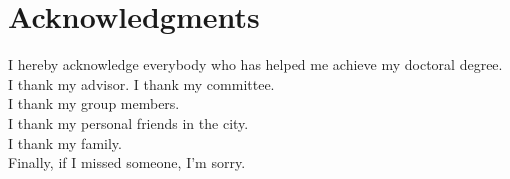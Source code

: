 


\bigskip

\begingroup
\let\clearpage\relax
\let\cleardoublepage\relax
\let\cleardoublepage\relax

\chapter*{Acknowledgments}
I hereby acknowledge everybody who has helped me achieve my doctoral degree.\\


I thank my advisor. I thank my committee.\\

I thank my group members. \\

I thank my personal friends in the city. \\

I thank my family. \\

Finally, if I missed someone, I'm sorry. \\
\bigskip

\begin{flushright}
\myName \\
\myLocation \\
\myMonth \myYear
\end{flushright}

\endgroup 

\cleardoublepage